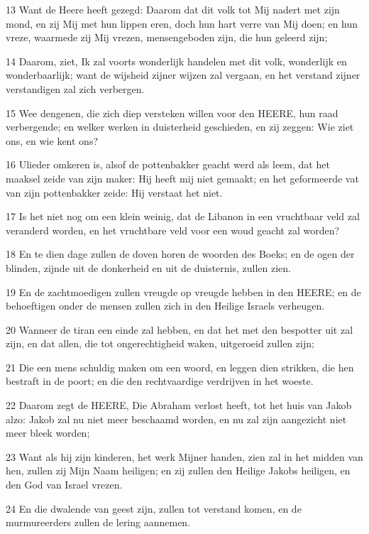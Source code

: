 \par 13 Want de Heere heeft gezegd: Daarom dat dit volk tot Mij nadert met zijn mond, en zij Mij met hun lippen eren, doch hun hart verre van Mij doen; en hun vreze, waarmede zij Mij vrezen, mensengeboden zijn, die hun geleerd zijn;
\par 14 Daarom, ziet, Ik zal voorts wonderlijk handelen met dit volk, wonderlijk en wonderbaarlijk; want de wijsheid zijner wijzen zal vergaan, en het verstand zijner verstandigen zal zich verbergen.
\par 15 Wee dengenen, die zich diep versteken willen voor den HEERE, hun raad verbergende; en welker werken in duisterheid geschieden, en zij zeggen: Wie ziet ons, en wie kent ons?
\par 16 Ulieder omkeren is, alsof de pottenbakker geacht werd als leem, dat het maaksel zeide van zijn maker: Hij heeft mij niet gemaakt; en het geformeerde vat van zijn pottenbakker zeide: Hij verstaat het niet.
\par 17 Is het niet nog om een klein weinig, dat de Libanon in een vruchtbaar veld zal veranderd worden, en het vruchtbare veld voor een woud geacht zal worden?
\par 18 En te dien dage zullen de doven horen de woorden des Boeks; en de ogen der blinden, zijnde uit de donkerheid en uit de duisternis, zullen zien.
\par 19 En de zachtmoedigen zullen vreugde op vreugde hebben in den HEERE; en de behoeftigen onder de mensen zullen zich in den Heilige Israels verheugen.
\par 20 Wanneer de tiran een einde zal hebben, en dat het met den bespotter uit zal zijn, en dat allen, die tot ongerechtigheid waken, uitgeroeid zullen zijn;
\par 21 Die een mens schuldig maken om een woord, en leggen dien strikken, die hen bestraft in de poort; en die den rechtvaardige verdrijven in het woeste.
\par 22 Daarom zegt de HEERE, Die Abraham verlost heeft, tot het huis van Jakob alzo: Jakob zal nu niet meer beschaamd worden, en nu zal zijn aangezicht niet meer bleek worden;
\par 23 Want als hij zijn kinderen, het werk Mijner handen, zien zal in het midden van hen, zullen zij Mijn Naam heiligen; en zij zullen den Heilige Jakobs heiligen, en den God van Israel vrezen.
\par 24 En die dwalende van geest zijn, zullen tot verstand komen, en de murmureerders zullen de lering aannemen.

